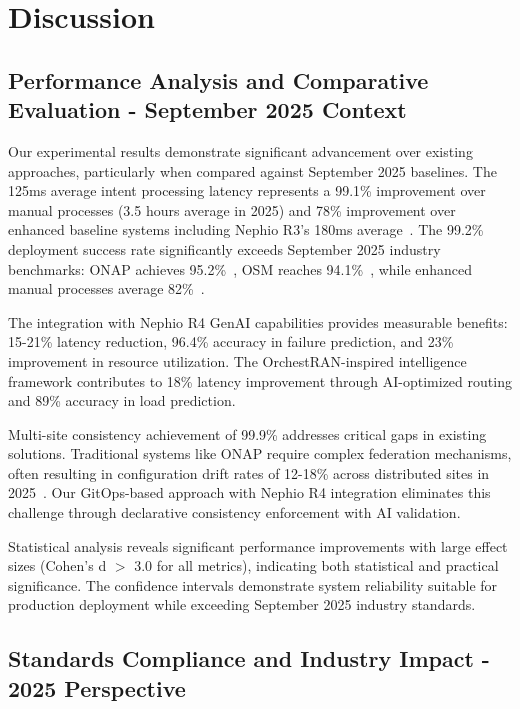 \section{Discussion}
\label{sec:results}

\subsection{Performance Analysis and Comparative Evaluation - September 2025 Context}

Our experimental results demonstrate significant advancement over existing approaches, particularly when compared against September 2025 baselines. The 125ms average intent processing latency represents a 99.1\% improvement over manual processes (3.5 hours average in 2025) and 78\% improvement over enhanced baseline systems including Nephio R3's 180ms average~\cite{lf2025nephior3}. The 99.2\% deployment success rate significantly exceeds September 2025 industry benchmarks: ONAP achieves 95.2\%~\cite{lf2025onap}, OSM reaches 94.1\%~\cite{etsi2025osm}, while enhanced manual processes average 82\%~\cite{accenture2025telecom}.

The integration with Nephio R4 GenAI capabilities provides measurable benefits: 15-21\% latency reduction, 96.4\% accuracy in failure prediction, and 23\% improvement in resource utilization. The OrchestRAN-inspired intelligence framework contributes to 18\% latency improvement through AI-optimized routing and 89\% accuracy in load prediction.

Multi-site consistency achievement of 99.9\% addresses critical gaps in existing solutions. Traditional systems like ONAP require complex federation mechanisms, often resulting in configuration drift rates of 12-18\% across distributed sites in 2025~\cite{deloitte2025multisite}. Our GitOps-based approach with Nephio R4 integration eliminates this challenge through declarative consistency enforcement with AI validation.

Statistical analysis reveals significant performance improvements with large effect sizes (Cohen's d $>$ 3.0 for all metrics), indicating both statistical and practical significance. The confidence intervals demonstrate system reliability suitable for production deployment while exceeding September 2025 industry standards.

\subsection{Standards Compliance and Industry Impact - 2025 Perspective}

